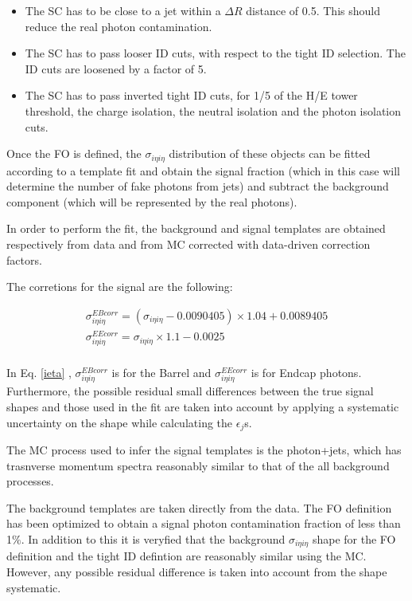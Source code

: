 \documentclass[12pt,oneandhalf,chaparabic,phys,ms,eng]{metu}
\begin{document}
\begin{itemize}

\item The SC has to be close to a jet within a $\Delta R$ distance of 0.5. This should reduce the real photon contamination.
\item The SC has to pass looser ID cuts, with respect to the tight ID selection. The ID cuts are loosened by a factor of 5.
\item The SC has to pass inverted tight ID cuts, for 1/5 of the H/E tower threshold, the charge isolation, the neutral isolation and the photon isolation cuts.

\end{itemize}

Once the FO is defined, the $\sigma_{i \eta i \eta}$ distribution of these objects can be fitted according to a template fit and obtain the signal fraction (which in this case will determine the number of fake photons from jets) and 
subtract the background component (which will be represented by the real photons). 

In order to perform the fit, the background and signal templates are obtained respectively from data and from MC corrected with data-driven correction factors. 

The corretions for the signal are the following:

\begin{eqnarray}
\label{ieta}
\sigma_{i \eta i \eta}^{EB corr} = (\sigma_{i \eta i \eta} - 0.0090405) \times 1.04 + 0.0089405 \nonumber \\
\sigma_{i \eta i \eta}^{EE corr} = \sigma_{i \eta i \eta} \times 1.1 - 0.0025 \nonumber \\
\end{eqnarray}

In Eq. \ref{ieta} , $\sigma_{i \eta i \eta}^{EB corr}$ is for the Barrel and $\sigma_{i \eta i \eta}^{EE corr}$ is for Endcap photons. Furthermore, the possible residual small differences between the true signal shapes and those used in the fit are taken into account by applying a systematic uncertainty on the shape while calculating the $\epsilon_{j}$s. 

The MC process used to infer the signal templates is the photon+jets, which has trasnverse momentum spectra reasonably similar to that of the all background processes. 

The background templates are taken directly from the data. The FO definition has been optimized to obtain a signal photon contamination fraction of less than 1$\%$. In addition to this it is veryfied that the background $\sigma_{i \eta 
i \eta}$ shape for the FO definition and the tight ID defintion are reasonably similar using the MC. However, any possible residual difference is taken into account from the shape systematic. 
\end{document}
